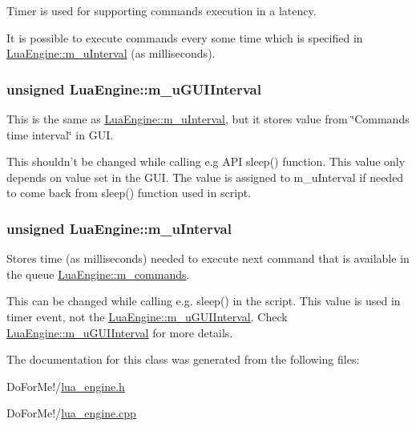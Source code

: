 Timer is used for supporting commands execution in a latency. 

It is possible to execute commands every some time which is specified in \hyperlink{class_lua_engine_af25b4a96c17c157ae110afa1dd0866ec}{Lua\-Engine\-::m\-\_\-u\-Interval} (as milliseconds). \hypertarget{class_lua_engine_ac7d00771a353cc9afa586a6ec10f5d90}{
\subsubsection[{m\-\_\-u\-G\-U\-I\-Interval}]{\setlength{\rightskip}{0pt plus 5cm}unsigned Lua\-Engine\-::m\-\_\-u\-G\-U\-I\-Interval\hspace{0.3cm}{\ttfamily [private]}}}\label{class_lua_engine_ac7d00771a353cc9afa586a6ec10f5d90}


This is the same as \hyperlink{class_lua_engine_af25b4a96c17c157ae110afa1dd0866ec}{Lua\-Engine\-::m\-\_\-u\-Interval}, but it stores value from \char`\"{}\-Commands time interval\char`\"{} in G\-U\-I. 

This shouldn't be changed while calling e.\-g A\-P\-I sleep() function. This value only depends on value set in the G\-U\-I. The value is assigned to m\-\_\-u\-Interval if needed to come back from sleep() function used in script. \hypertarget{class_lua_engine_af25b4a96c17c157ae110afa1dd0866ec}{
\subsubsection[{m\-\_\-u\-Interval}]{\setlength{\rightskip}{0pt plus 5cm}unsigned Lua\-Engine\-::m\-\_\-u\-Interval\hspace{0.3cm}{\ttfamily [private]}}}\label{class_lua_engine_af25b4a96c17c157ae110afa1dd0866ec}


Stores time (as milliseconds) needed to execute next command that is available in the queue \hyperlink{class_lua_engine_a86a3f32127e36e1ccce6c5a42a298ad5}{Lua\-Engine\-::m\-\_\-commands}. 

This can be changed while calling e.\-g. sleep() in the script. This value is used in timer event, not the \hyperlink{class_lua_engine_ac7d00771a353cc9afa586a6ec10f5d90}{Lua\-Engine\-::m\-\_\-u\-G\-U\-I\-Interval}. Check \hyperlink{class_lua_engine_ac7d00771a353cc9afa586a6ec10f5d90}{Lua\-Engine\-::m\-\_\-u\-G\-U\-I\-Interval} for more details. 

The documentation for this class was generated from the following files\-:\begin{DoxyCompactItemize}
\item 
Do\-For\-Me!/\hyperlink{lua__engine_8h}{lua\-\_\-engine.\-h}\item 
Do\-For\-Me!/\hyperlink{lua__engine_8cpp}{lua\-\_\-engine.\-cpp}\end{DoxyCompactItemize}
